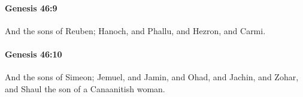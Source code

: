 		\paragraph{Genesis 46:9} %
			\label{GENESIS-46-9}

			And the sons of Reuben; Hanoch, and Phallu, and Hezron, and Carmi.


		\paragraph{Genesis 46:10} %
			\label{GENESIS-46-10}

			And the sons of Simeon; Jemuel, and Jamin, and Ohad, and Jachin, and Zohar, and Shaul the son of a Canaanitish woman.


